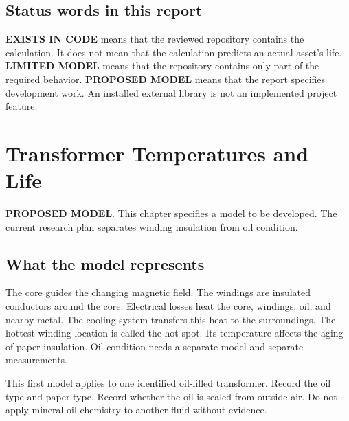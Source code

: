 \documentclass[11pt,a4paper]{report}
\newcommand{\implemented}{\textbf{\textcolor{reportgreen}{EXISTS IN CODE}}}
\newcommand{\proposed}{\textbf{\textcolor{reportblue}{PROPOSED MODEL}}}
\newcommand{\limited}{\textbf{\textcolor{reportamber}{LIMITED MODEL}}}
\begin{document}
\section{Status words in this report}
\implemented{} means that the reviewed repository contains the calculation.
It does not mean that the calculation predicts an actual asset's life.
\limited{} means that the repository contains only part of the required behavior.
\proposed{} means that the report specifies development work.
An installed external library is not an implemented project feature.

\chapter{Transformer Temperatures and Life}
\label{chap:transformer}
\proposed. This chapter specifies a model to be developed.
The current research plan separates winding insulation from oil condition.

\section{What the model represents}
The core guides the changing magnetic field.
The windings are insulated conductors around the core.
Electrical losses heat the core, windings, oil, and nearby metal.
The cooling system transfers this heat to the surroundings.
The hottest winding location is called the hot spot.
Its temperature affects the aging of paper insulation.
Oil condition needs a separate model and separate measurements.

This first model applies to one identified oil-filled transformer.
Record the oil type and paper type.
Record whether the oil is sealed from outside air.
Do not apply mineral-oil chemistry to another fluid without evidence.
\end{document}
